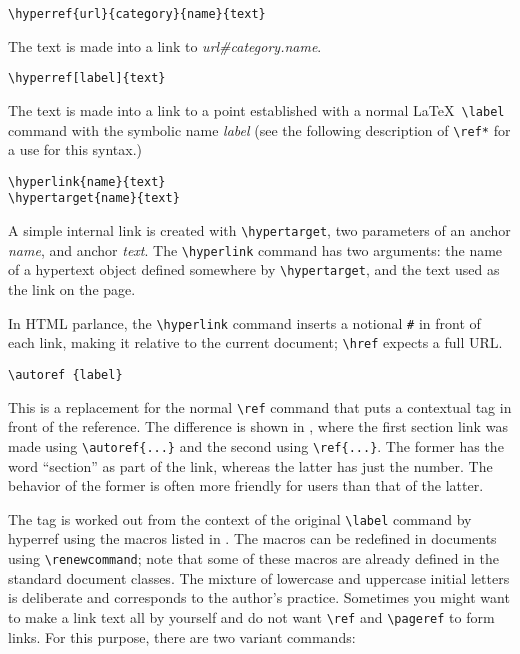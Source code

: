 \begin{verbatim}
\hyperref{url}{category}{name}{text} 
\end{verbatim}

The text is made into a link to \emph{url\#category.name}. 

\begin{verbatim}
\hyperref[label]{text} 
\end{verbatim}

The text is made into a link to a point established with a normal \LaTeX\ \verb|\label| 
command with the symbolic name \emph{label} (see the following description of \verb|\ref*| for 
a use for this syntax.) 

\begin{verbatim}
\hyperlink{name}{text} 
\hypertarget{name}{text} 
\end{verbatim}

A simple internal link is created with \verb|\hypertarget|, two parameters of an anchor 
\emph{name}, and anchor \emph{text}. The \verb|\hyperlink| command has two arguments: the name of 
a hypertext object defined somewhere by \verb|\hypertarget|, and the text used as the 
link on the page. 

In HTML parlance, the \verb|\hyperlink| command inserts a notional \verb|#| in front of 
each link, making it relative to the current document; \verb|\href| expects a full URL. 


\begin{verbatim}
\autoref {label} 
\end{verbatim}

This is a replacement for the normal \verb|\ref| command that puts a
contextual tag in front of the reference. The difference is shown in
, where the first section link was made using
\verb|\autoref{...}| and the second using \verb|\ref{...}|. The former
has the word ``section'' as part of the link, whereas the latter has
just the number. The behavior of the former is often more friendly for
users than that of the latter. 

The tag is worked out from the context of the original \verb|\label|
command by hyperref using the macros listed in . The macros can
be redefined in documents using \verb|\renewcommand|; note that some of
these macros are already defined in the standard document classes. The
mixture of lowercase and uppercase initial letters is deliberate and
corresponds to the author's practice.  Sometimes you might want to make
a link text all by yourself and do not want \verb|\ref| and
\verb|\pageref| to form links. For this purpose, there are two variant
commands: 

